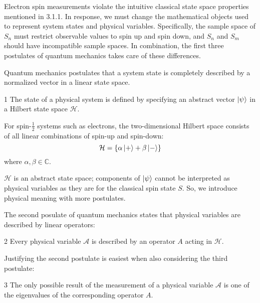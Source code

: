 Electron spin measurements violate the intuitive classical state space properties mentioned in 3.1.1. In response, we must change the mathematical objects used to represent system states and physical variables. Specifically, the sample space of $S_n$ must restrict observable values to spin up and spin down, and $S_n$ and $S_m$ should have incompatible sample spaces. In combination, the first three postulates of quantum mechanics takes care of these differences.

Quantum mechanics postulates that a system state is completely described by a normalized vector in a linear state space.

\begin{Thm:Postulate}{1}
    The state of a physical system is defined by specifying an abstract vector $\ket{\psi}$ in a Hilbert state space $\mathcal{H}$.
\end{Thm:Postulate}

For spin-$\frac{1}{2}$ systems such as electrons, the two-dimensional Hilbert space consists of all linear combinations of spin-up and spin-down:
\begin{equation}
    \mathcal{H} = \{\alpha\ket{+} + \beta\ket{-}\}
\end{equation}
where $\alpha, \beta \in \mathbb{C}$.

$\mathcal{H}$ is an abstract state space; components of $\ket{\psi}$ cannot be interpreted as physical variables as they are for the classical spin state $S$. So, we introduce physical meaning with more postulates.

The second posulate of quantum mechanics states that physical variables are described by linear operators:
\begin{Thm:Postulate}{2}
    Every physical variable $\mathcal{A}$ is described by an operator $A$ acting in $\mathcal{H}$.
\end{Thm:Postulate}

Justifying the second postulate is easiest when also considering the third postulate:
\begin{Thm:Postulate}{3}
    The only possible result of the measurement of a physical variable $\mathcal{A}$ is one of the eigenvalues of the corresponding operator $A$.
\end{Thm:Postulate}

